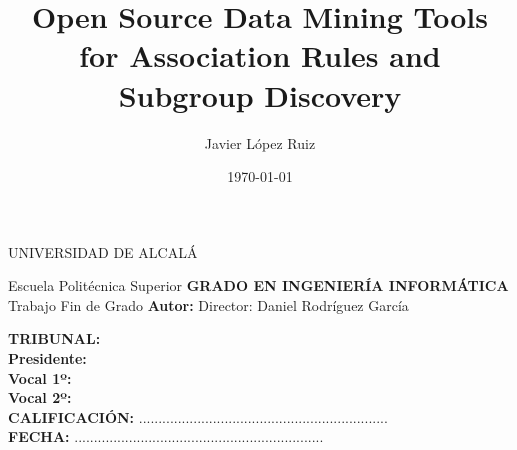 \documentclass[a4paper, 11pt, twoside]{Thesis}  %
\begin{document}
\frontmatter      %

\title  {Open Source Data Mining Tools for Association Rules and Subgroup Discovery}
\author  {Javier López Ruiz}    
\addresses  {\groupname\\\deptname\\\univname}  %
\date       {\today}
\subject    {}
\keywords   {}

\makeatletter
\let\thetitle\@title
\let\theauthor\@author
\makeatother

\begin{center}
	\Large
	UNIVERSIDAD DE ALCALÁ
	
	Escuela Politécnica Superior
	\linebreak
	\linebreak
	\textbf{GRADO EN INGENIERÍA INFORMÁTICA}
	\linebreak
	\linebreak
	Trabajo Fin de Grado
	\linebreak
	\linebreak
	\textbf{\thetitle}
	\linebreak
	\linebreak
	\textbf{Autor:} \theauthor
	\linebreak
	\linebreak
	Director: Daniel Rodríguez García
	\linebreak
\end{center}

\begin{flushleft}
	\textbf{TRIBUNAL:}
	\\[2cm]
	\textbf{Presidente:}
	\\[2.5cm]
	\textbf{Vocal 1º:}
	\\[2.5cm]
	\textbf{Vocal 2º:}
	\\[2cm]
	\textbf{CALIFICACIÓN:} ................................................................
	\\
	\textbf{FECHA:}
	\space\space\space\space\space\space\space\space\space\space\space\space\space\space
	................................................................
\end{flushleft}

\maketitle
\end{document}
